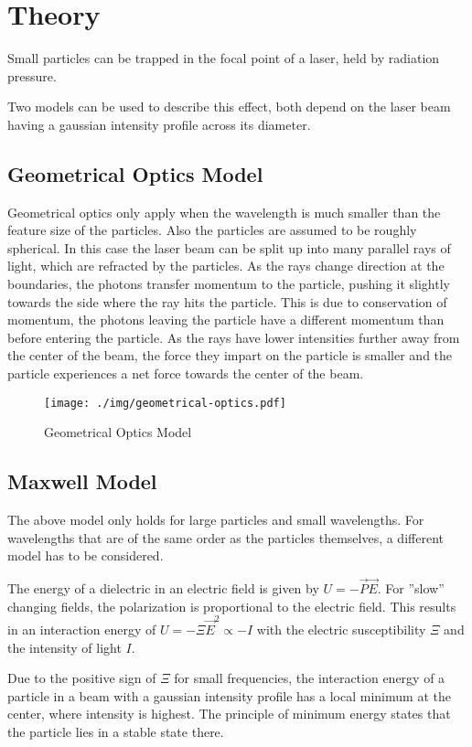 \chapter{Theory}
Small particles can be trapped in the focal point of a laser, held by radiation pressure.

Two models can be used to describe this effect, both depend on the laser beam having a gaussian intensity profile across its diameter.

\section{Geometrical Optics Model}
Geometrical optics only apply when the wavelength is much smaller than the feature size of the particles.
Also the particles are assumed to be roughly spherical.
In this case the laser beam can be split up into many parallel rays of light, which are refracted by the particles.
As the rays change direction at the boundaries, the photons transfer momentum to the particle, pushing it slightly towards the side where the ray hits the particle.
This is due to conservation of momentum, the photons leaving the particle have a different momentum than before entering the particle.
As the rays have lower intensities further away from the center of the beam, the force they impart on the particle is smaller and the particle experiences a net force towards the center of the beam.
\begin{figure}[bp]
  \centering
  \texttt{[image: ./img/geometrical-optics.pdf]}
  \caption{Geometrical Optics Model}
\end{figure}

\section{Maxwell Model}
The above model only holds for large particles and small wavelengths.
For wavelengths that are of the same order as the particles themselves, a different model has to be considered.

The energy of a dielectric in an electric field is given by $U = -\vec{P}\vec{E}$.
For ''slow'' changing fields, the polarization is proportional to the electric field.
This results in an interaction energy of $U = -\Xi \vec{E}^2 \propto -I$ with the electric susceptibility $\Xi$ and the intensity of light $I$.

Due to the positive sign of $\Xi$ for small frequencies, the interaction energy of a particle in a beam with a gaussian intensity profile has a local minimum at the center, where intensity is highest.
The principle of minimum energy states that the particle lies in a stable state there. 
